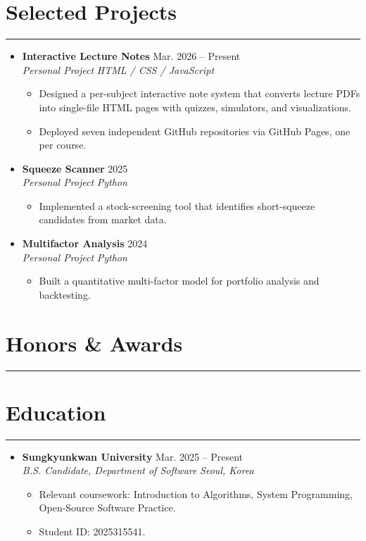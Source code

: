 \documentclass[letterpaper, 10pt]{article}
\begin{document}
\section*{Selected Projects}
\hrule
\vspace{4pt}
\begin{itemize}
    \item[]
    \textbf{Interactive Lecture Notes} \hfill Mar. 2026 -- Present \\
    \textit{Personal Project} \hfill \textit{HTML / CSS / JavaScript}
    \begin{itemize}
        \item Designed a per-subject interactive note system that converts lecture PDFs into single-file HTML pages with quizzes, simulators, and visualizations.
        \item Deployed seven independent GitHub repositories via GitHub Pages, one per course.
    \end{itemize}
    \item[]
    \textbf{Squeeze Scanner} \hfill 2025 \\
    \textit{Personal Project} \hfill \textit{Python}
    \begin{itemize}
        \item Implemented a stock-screening tool that identifies short-squeeze candidates from market data.
    \end{itemize}
    \item[]
    \textbf{Multifactor Analysis} \hfill 2024 \\
    \textit{Personal Project} \hfill \textit{Python}
    \begin{itemize}
        \item Built a quantitative multi-factor model for portfolio analysis and backtesting.
    \end{itemize}
\end{itemize}

\section*{Honors \& Awards}
\hrule
\vspace{4pt}

\section*{Education}
\hrule
\vspace{4pt}
\begin{itemize}
    \item[]
    \textbf{Sungkyunkwan University} \hfill Mar. 2025 -- Present \\
    \textit{B.S. Candidate, Department of Software} \hfill \textit{Seoul, Korea}
    \begin{itemize}
        \item Relevant coursework: Introduction to Algorithms, System Programming, Open-Source Software Practice.
        \item Student ID: 2025315541.
    \end{itemize}
\end{itemize}

\end{document}
